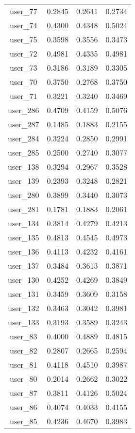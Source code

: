 \begin{table}[ht]
\begin{tabular}{|c|c|c|c|}
user_77  &  0.2845   &  0.2641   &  0.2734 \\ 
user_74  &  0.4300   &  0.4348   &  0.5024 \\ 
user_75  &  0.3598   &  0.3556   &  0.3473 \\ 
user_72  &  0.4981   &  0.4335   &  0.4981 \\ 
user_73  &  0.3186   &  0.3189   &  0.3305 \\ 
user_70  &  0.3750   &  0.2768   &  0.3750 \\ 
user_71  &  0.3221   &  0.3240   &  0.3469 \\ 
user_286  &  0.4709   &  0.4159   &  0.5076 \\ 
user_287  &  0.1485   &  0.1883   &  0.2155 \\ 
user_284  &  0.3224   &  0.2850   &  0.2991 \\ 
user_285  &  0.2500   &  0.2740   &  0.3077 \\ 
user_138  &  0.3294   &  0.2967   &  0.3528 \\ 
user_139  &  0.2393   &  0.3248   &  0.2821 \\ 
user_280  &  0.3899   &  0.3440   &  0.3073 \\ 
user_281  &  0.1781   &  0.1883   &  0.2061 \\ 
user_134  &  0.3814   &  0.4279   &  0.4213 \\ 
user_135  &  0.4813   &  0.4545   &  0.4973 \\ 
user_136  &  0.4113   &  0.4232   &  0.4161 \\ 
user_137  &  0.3484   &  0.3613   &  0.3871 \\ 
user_130  &  0.4252   &  0.4269   &  0.3849 \\ 
user_131  &  0.3459   &  0.3609   &  0.3158 \\ 
user_132  &  0.3463   &  0.3042   &  0.3981 \\ 
user_133  &  0.3193   &  0.3589   &  0.3243 \\ 
user_83  &  0.4000   &  0.4889   &  0.4815 \\ 
user_82  &  0.2807   &  0.2665   &  0.2594 \\ 
user_81  &  0.4118   &  0.4510   &  0.3987 \\ 
user_80  &  0.2014   &  0.2662   &  0.3022 \\ 
user_87  &  0.3811   &  0.4126   &  0.5024 \\ 
user_86  &  0.4074   &  0.4033   &  0.4155 \\ 
user_85  &  0.4236   &  0.4670   &  0.3983 \\ 

\end{tabular}
\end{table}
